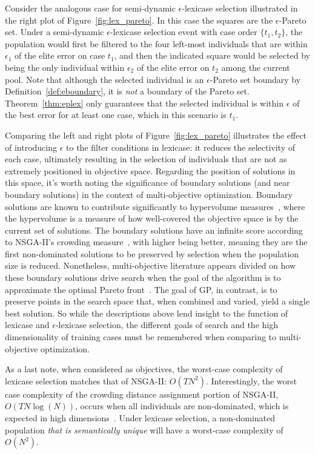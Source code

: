 \documentclass[twoside]{article}
\begin{document}
Consider the analogous case for semi-dynamic $\epsilon$-lexicase selection illustrated in the right plot of Figure~\ref{fig:lex_pareto}. In this case the squares are the $\epsilon$-Pareto set. Under a semi-dynamic $\epsilon$-lexicase selection event with case order $\{t_1, t_2\}$, the population would first be filtered to the four left-most individuals that are within $\epsilon_1$ of the elite error on case $t_1$, and then the indicated square would be selected by being the only individual within $\epsilon_2$ of the elite error on $t_2$ among the current pool. Note that although the selected individual is an $\epsilon$-Pareto set boundary by Definition~\ref{def:eboundary}, it is {\it not} a boundary of the Pareto set. Theorem~\ref{thm:eplex} only guarantees that the selected individual is within $\epsilon$ of the best error for at least one case, which in this scenario is $t_1$. 

Comparing the left and right plots of Figure~\ref{fig:lex_pareto} illustrates the effect of introducing $\epsilon$ to the filter conditions in lexicase: it reduces the selectivity of each case, ultimately resulting in the selection of individuals that are not as extremely positioned in objective space. Regarding the position of solutions in this space, it's worth noting the significance of boundary solutions (and near boundary solutions) in the context of multi-objective optimization. Boundary solutions are known to contribute significantly to hypervolume measures~\citep{deb_evaluating_2005}, where the hypervolume is a measure of how well-covered the objective space is by the current set of solutions. The boundary solutions have an infinite score according to NSGA-II's crowding measure~\citep{schoenauer_fast_2000}, with higher being better, meaning they are the first non-dominated solutions to be preserved by selection when the population size is reduced. Nonetheless, multi-objective literature appears divided on how these boundary solutions drive search when the goal of the algorithm is to approximate the optimal Pareto front~\citep{wagner_pareto-_2007}. The goal of GP, in contrast, is to preserve points in the search space that, when combined and varied, yield a single best solution. So while the descriptions above lend insight to the function of lexicase and $\epsilon$-lexicase selection, the different goals of search and the high dimensionality of training cases must be remembered when comparing to multi-objective optimization. 

As a last note, when considered as objectives, the worst-case complexity of lexicase selection matches that of NSGA-II: $O(TN^2)$. Interestingly, the worst case complexity of the crowding distance assignment portion of NSGA-II, $O(TN\log(N))$, occurs when all individuals are non-dominated, which is expected in high dimensions~\citep{farina_optimal_2002, wagner_pareto-_2007}. Under lexicase selection, a non-dominated population {\it that is semantically unique} will have a worst-case complexity of $O(N^2)$. 
\end{document}
